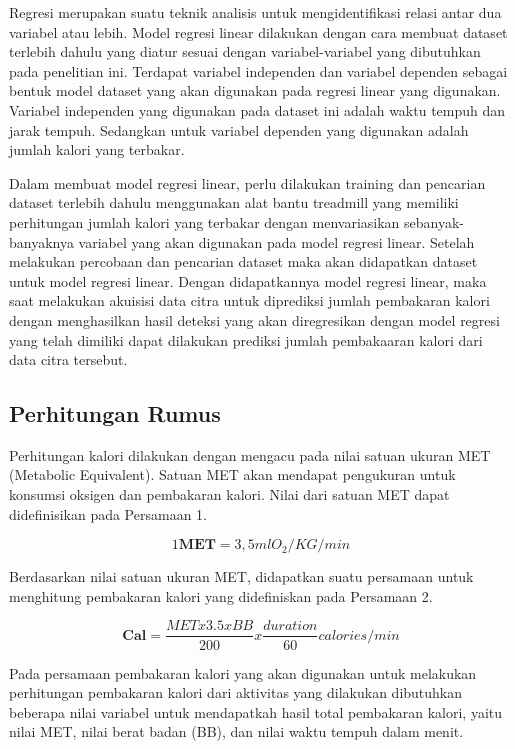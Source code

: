 Regresi merupakan suatu teknik analisis untuk mengidentifikasi relasi antar dua variabel atau lebih. Model regresi linear dilakukan dengan cara membuat dataset terlebih dahulu yang diatur sesuai dengan variabel-variabel yang dibutuhkan pada penelitian ini. Terdapat variabel independen dan variabel dependen sebagai bentuk model dataset yang akan digunakan pada regresi linear yang digunakan. Variabel independen yang digunakan pada dataset ini adalah waktu tempuh dan jarak tempuh. Sedangkan untuk variabel dependen yang digunakan adalah jumlah kalori yang terbakar.

Dalam membuat model regresi linear, perlu dilakukan training dan pencarian dataset terlebih dahulu menggunakan alat bantu treadmill yang memiliki perhitungan jumlah kalori yang terbakar dengan menvariasikan sebanyak-banyaknya variabel yang akan digunakan pada model regresi linear. Setelah melakukan percobaan dan pencarian dataset maka akan didapatkan dataset untuk model regresi linear. Dengan didapatkannya model regresi linear, maka saat melakukan akuisisi data citra untuk diprediksi jumlah pembakaran kalori dengan menghasilkan hasil deteksi yang akan diregresikan dengan model regresi yang telah dimiliki dapat dilakukan prediksi jumlah pembakaaran kalori dari data citra tersebut.

\subsection{Perhitungan Rumus}
\label{subsec:PrediksiPerhitungan}

Perhitungan kalori dilakukan dengan mengacu pada nilai satuan ukuran MET (Metabolic Equivalent). Satuan MET akan mendapat pengukuran untuk konsumsi oksigen dan pembakaran kalori. Nilai dari satuan MET dapat didefinisikan pada Persamaan 1.

\begin{equation}
  \label{eq:SatuanMET}
  1 \mathbf{MET} = 3,5 ml O_2  / KG / min
\end{equation}

Berdasarkan nilai satuan ukuran MET, didapatkan suatu persamaan untuk menghitung pembakaran kalori yang didefiniskan pada Persamaan 2.

\begin{equation}
  \label{eq:RumusKalori}
  \mathbf{Cal} = \frac{MET  x 3.5 x BB}{200} x \frac{duration}{60} calories / min
\end{equation}

Pada persamaan pembakaran kalori yang akan digunakan untuk melakukan perhitungan pembakaran kalori dari aktivitas yang dilakukan dibutuhkan beberapa nilai variabel untuk mendapatkah hasil total pembakaran kalori, yaitu nilai MET, nilai berat badan (BB), dan nilai waktu tempuh dalam menit.

